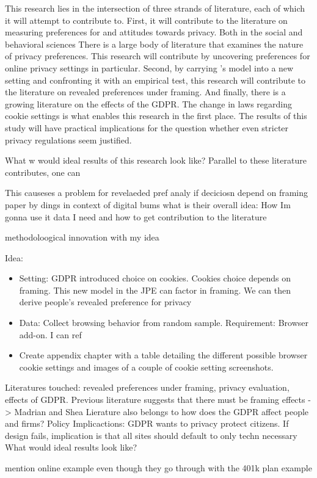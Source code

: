 This research lies in the intersection of three strands of literature, each of which it will attempt to contribute to. First, it will contribute to the 
literature on measuring preferences for and attitudes towards privacy. Both in the social and behavioral sciences There is a large body of literature that examines the 
nature of privacy preferences. This research will contribute by uncovering preferences for online privacy settings in particular. Second, by carrying \textcite{goldin2020}'s
model into a new setting and confronting it with an empirical test, this research will contribute to the literature on revealed preferences under framing.
And finally, there is a growing literature on the effects of the GDPR. The change in laws regarding cookie settings is what enables this research in the first place.
The results of this study will have practical implications for the question whether even stricter privacy regulations seem justified.

What w would ideal results of this research look like? Parallel to these literature contributes, one can 







This causeses a problem for revelaeded pref analy if deciciosn depend on framing  paper by dings  in context of digital bums
what is their overall idea:
How Im gonna use it 
data I need and how to get 
contribution to the literature


methodoloogical innovation with my idea




Idea: 
\begin{itemize}
    \item Setting: GDPR introduced choice on cookies. Cookies choice depends on framing. This new model in the JPE can factor in framing. We can then derive people's revealed preference for privacy
    \item Data: Collect browsing behavior from random sample. Requirement: Browser add-on. I can ref
    \item Create appendix chapter with a table detailing the different possible browser cookie settings and images of a couple of cookie setting screenshots.
\end{itemize}


Literatures touched: revealed preferences under framing, privacy evaluation, effects of GDPR.
Previous literature suggests that there must be framing effects -> Madrian and Shea
Lierature also belongs to how does the GDPR affect people and firms?
Policy Implicactions: GDPR wants to privacy protect citizens. If design fails, implication is 
that all sites should default to only techn necessary
What would ideal results look like?

\cite{acquisti2015privacy}  mention online example even though they go through with the 401k plan example